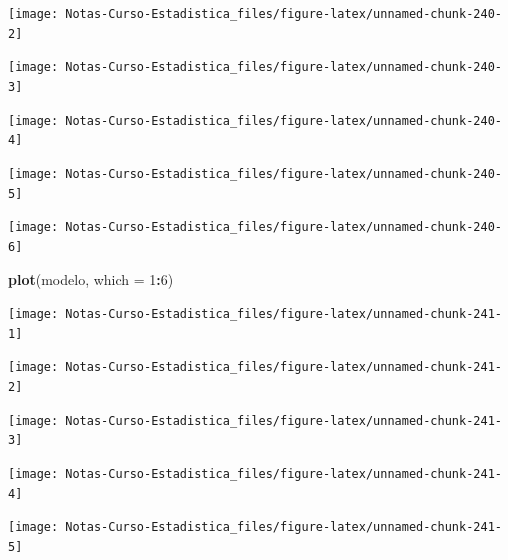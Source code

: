 \documentclass[
  12pt,
]{book}
\newenvironment{Shaded}{\begin{snugshade}}{\end{snugshade}}
\newcommand{\DataTypeTok}[1]{\textcolor[rgb]{0.13,0.29,0.53}{#1}}
\newcommand{\DecValTok}[1]{\textcolor[rgb]{0.00,0.00,0.81}{#1}}
\newcommand{\KeywordTok}[1]{\textcolor[rgb]{0.13,0.29,0.53}{\textbf{#1}}}
\newcommand{\NormalTok}[1]{#1}
\newcommand{\OperatorTok}[1]{\textcolor[rgb]{0.81,0.36,0.00}{\textbf{#1}}}
\theoremstyle{definition}
\theoremstyle{definition}
\theoremstyle{definition}
\theoremstyle{remark}
\begin{document}
\begin{center}\texttt{[image: Notas-Curso-Estadistica\_files/figure-latex/unnamed-chunk-240-2]} \end{center}

\begin{center}\texttt{[image: Notas-Curso-Estadistica\_files/figure-latex/unnamed-chunk-240-3]} \end{center}

\begin{center}\texttt{[image: Notas-Curso-Estadistica\_files/figure-latex/unnamed-chunk-240-4]} \end{center}

\begin{center}\texttt{[image: Notas-Curso-Estadistica\_files/figure-latex/unnamed-chunk-240-5]} \end{center}

\begin{center}\texttt{[image: Notas-Curso-Estadistica\_files/figure-latex/unnamed-chunk-240-6]} \end{center}

\begin{Shaded}
\begin{Highlighting}[]
\KeywordTok{plot}\NormalTok{(modelo, }\DataTypeTok{which =} \DecValTok{1}\OperatorTok{:}\DecValTok{6}\NormalTok{)}
\end{Highlighting}
\end{Shaded}

\begin{center}\texttt{[image: Notas-Curso-Estadistica\_files/figure-latex/unnamed-chunk-241-1]} \end{center}

\begin{center}\texttt{[image: Notas-Curso-Estadistica\_files/figure-latex/unnamed-chunk-241-2]} \end{center}

\begin{center}\texttt{[image: Notas-Curso-Estadistica\_files/figure-latex/unnamed-chunk-241-3]} \end{center}

\begin{center}\texttt{[image: Notas-Curso-Estadistica\_files/figure-latex/unnamed-chunk-241-4]} \end{center}

\begin{center}\texttt{[image: Notas-Curso-Estadistica\_files/figure-latex/unnamed-chunk-241-5]} \end{center}
\end{document}
